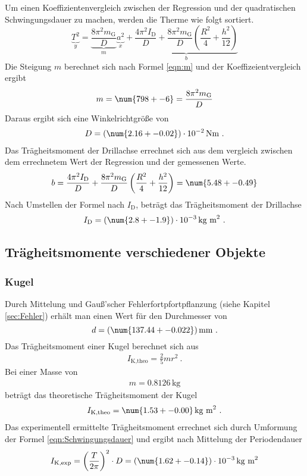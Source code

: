 Um einen Koeffizientenvergleich zwischen der Regression und der quadratischen Schwingungsdauer zu machen, werden die Therme wie folgt sortiert.
\begin{equation}
	\underbrace{T^2}_y = \underbrace{\frac{8 \pi^2 m_\text{G}}{D}}_m \underbrace{a^2}_x + \underbrace{\frac{4 \pi^2 I_\text{D}}{D} + \frac{8\pi^2 m_\text{G}}{D} \left( \frac{R^2}{4} + \frac{h^2}{12} \right)}_b
\end{equation}
Die Steigung $m$ berechnet sich nach Formel \ref{eqn:m} und der Koeffizeientvergleich ergibt
\begin{align}
	m = \num{798 +- 6} = \frac{8 \pi^2 m_\text{G}}{D}
\end{align}
Daraus ergibt sich eine Winkelrichtgröße von
\begin{align}
	D = (\num{2.16 +- 0.02}) \cdot 10^{-2} \, \text{Nm} \ .
\end{align}
Das Trägheitsmoment der Drillachse errechnet sich aus dem vergleich zwischen dem errechnetem Wert der Regression und der gemessenen Werte.
\begin{align}
	b = \frac{4 \pi^2 I_\text{D}}{D} + \frac{8\pi^2 m_\text{G}}{D} \left( \frac{R^2}{4} + \frac{h^2}{12} \right) = \num{5.48 +- 0.49}
\end{align}
Nach Umstellen der Formel nach $I_\text{D}$, beträgt das Trägheitsmoment der Drillachse
\begin{align*}
	I_\text{D} = (\num{2.8 +- 1.9}) \cdot 10^{-3} \, \text{kg m}^2 \ .
\end{align*}




\subsection{Trägheitsmomente verschiedener Objekte}
\subsubsection{Kugel}
Durch Mittelung und Gauß'scher Fehlerfortpfortpflanzung (siehe Kapitel \ref{sec:Fehler}) erhält man einen Wert für den Durchmesser von
\begin{equation}
	d = (\num{137.44 +- 0.022}) \, \text{mm} \ .
\end{equation}
Das Trägheitsmoment einer Kugel berechnet sich aus
\begin{align}
	I_\text{K,theo} = \frac{2}{5} mr^2 \ .
\end{align}
Bei einer Masse von
\begin{align*}
	m = 0.8126 \, \text{kg}
\end{align*}
beträgt das theoretische Trägheitsmoment der Kugel
\begin{align}
	I_\text{K,theo} = \num{1.53 +- 0.00} \, \text{kg m}^2 \ .
\end{align}
Das experimentell ermittelte Trägheitsmoment errechnet sich durch Umformung der Formel \ref{eqn:Schwingungsdauer} und ergibt nach Mittelung der Periodendauer
\begin{equation}
	\label{eqn:T_K}
	I_\text{K,exp} = \left( \frac{T}{2 \pi} \right) ^2 \cdot D = (\num{1.62 +- 0.14}) \cdot 10^{-3} \, \text{kg m}^2
\end{equation}

